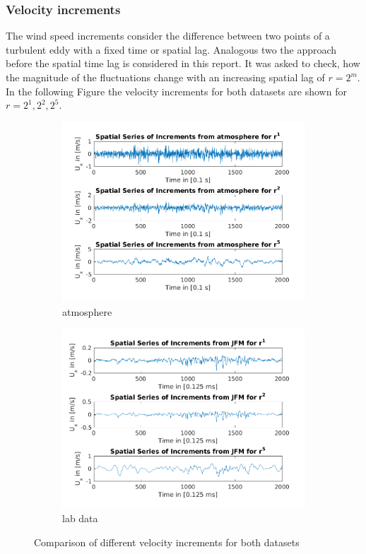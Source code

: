 \documentclass[12pt]{article}
\begin{document}
\subsubsection{Velocity increments}
The wind speed increments consider the difference between two points of a turbulent eddy with a fixed time or spatial lag. Analogous two the approach before the spatial time lag is considered in this report. It was asked to check, how the magnitude of the fluctuations change with an increasing spatial lag of $r = 2^m$. In the following Figure the velocity increments for both datasets are shown for $r = 2^1, 2^2, 2^5$.
\begin{figure}[H]
\begin{subfigure}{0.5\textwidth}
  \centering
  \includegraphics[width=1\linewidth]{figures/increments_array_atmo.png}
  \caption{atmosphere}
\end{subfigure}
\begin{subfigure}{0.5\textwidth}
  \centering
  \includegraphics[width=1\linewidth]{figures/increments_array_center.png}
  \caption{lab data}
\end{subfigure}
\caption{Comparison of different velocity increments for both datasets}
\label{fig:comparison_velo_incr}
\end{figure}
\end{document}
